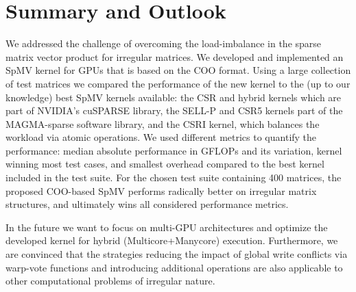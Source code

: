 \section{Summary and Outlook}
\label{2017-coo-spmv:s5-conclusion}
We addressed the challenge of overcoming the load-imbalance in the
sparse matrix vector product for irregular matrices.
We developed and implemented an SpMV kernel for GPUs that is based on the COO format.
Using a large collection of test matrices we compared the performance of the new kernel
to the (up to our knowledge) best SpMV kernels available: 
the CSR and hybrid kernels which are part of NVIDIA's cuSPARSE library, the SELL-P and CSR5 kernels
part of the MAGMA-sparse software library, and the CSRI kernel, which balances 
the workload via atomic operations.
We used different metrics to quantify the performance: 
median absolute performance in GFLOPs and its variation,
kernel winning most test cases, and
smallest overhead compared to the best kernel included in the test suite.
For the chosen test suite containing 400 matrices,
the proposed COO-based SpMV performs radically better on irregular matrix
structures, and ultimately wins all considered performance metrics.

In the future we want to focus on multi-GPU architectures
and optimize the developed kernel for hybrid (Multicore+Manycore) execution. 
Furthermore, we are convinced that the strategies reducing the impact of global
write conflicts via warp-vote functions and introducing additional operations
are also applicable to other computational problems of irregular nature.
